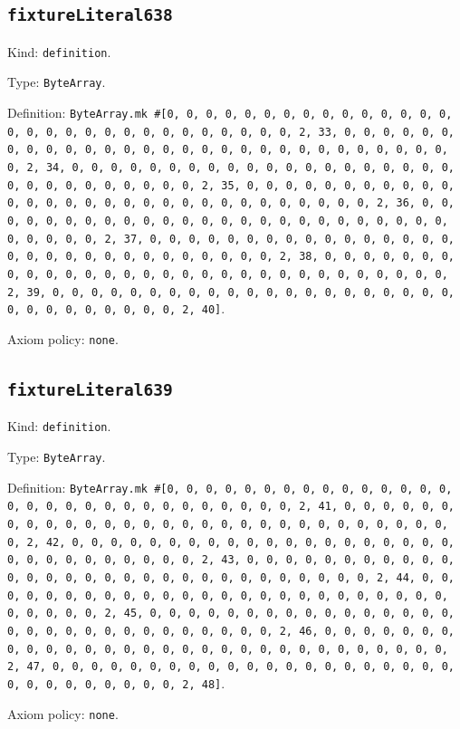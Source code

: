 \documentclass[11pt]{article}
\begin{document}
\subsection*{\texttt{fixtureLiteral638}}
\noindent Kind: \texttt{definition}.\par
\noindent Type: \texttt{ByteArray}.\par
\noindent Definition: \texttt{ByteArray.mk \#[0, 0, 0, 0, 0, 0, 0, 0, 0, 0, 0, 0, 0, 0, 0, 0, 0, 0, 0, 0, 0, 0, 0, 0, 0, 0, 0, 0, 0, 0, 2, 33, 0, 0, 0, 0, 0, 0, 0, 0, 0, 0, 0, 0, 0, 0, 0, 0, 0, 0, 0, 0, 0, 0, 0, 0, 0, 0, 0, 0, 0, 0, 2, 34, 0, 0, 0, 0, 0, 0, 0, 0, 0, 0, 0, 0, 0, 0, 0, 0, 0, 0, 0, 0, 0, 0, 0, 0, 0, 0, 0, 0, 0, 0, 2, 35, 0, 0, 0, 0, 0, 0, 0, 0, 0, 0, 0, 0, 0, 0, 0, 0, 0, 0, 0, 0, 0, 0, 0, 0, 0, 0, 0, 0, 0, 0, 2, 36, 0, 0, 0, 0, 0, 0, 0, 0, 0, 0, 0, 0, 0, 0, 0, 0, 0, 0, 0, 0, 0, 0, 0, 0, 0, 0, 0, 0, 0, 0, 2, 37, 0, 0, 0, 0, 0, 0, 0, 0, 0, 0, 0, 0, 0, 0, 0, 0, 0, 0, 0, 0, 0, 0, 0, 0, 0, 0, 0, 0, 0, 0, 2, 38, 0, 0, 0, 0, 0, 0, 0, 0, 0, 0, 0, 0, 0, 0, 0, 0, 0, 0, 0, 0, 0, 0, 0, 0, 0, 0, 0, 0, 0, 0, 2, 39, 0, 0, 0, 0, 0, 0, 0, 0, 0, 0, 0, 0, 0, 0, 0, 0, 0, 0, 0, 0, 0, 0, 0, 0, 0, 0, 0, 0, 0, 0, 2, 40]}.\par
\noindent Axiom policy: \texttt{none}.\par
\subsection*{\texttt{fixtureLiteral639}}
\noindent Kind: \texttt{definition}.\par
\noindent Type: \texttt{ByteArray}.\par
\noindent Definition: \texttt{ByteArray.mk \#[0, 0, 0, 0, 0, 0, 0, 0, 0, 0, 0, 0, 0, 0, 0, 0, 0, 0, 0, 0, 0, 0, 0, 0, 0, 0, 0, 0, 0, 0, 2, 41, 0, 0, 0, 0, 0, 0, 0, 0, 0, 0, 0, 0, 0, 0, 0, 0, 0, 0, 0, 0, 0, 0, 0, 0, 0, 0, 0, 0, 0, 0, 2, 42, 0, 0, 0, 0, 0, 0, 0, 0, 0, 0, 0, 0, 0, 0, 0, 0, 0, 0, 0, 0, 0, 0, 0, 0, 0, 0, 0, 0, 0, 0, 2, 43, 0, 0, 0, 0, 0, 0, 0, 0, 0, 0, 0, 0, 0, 0, 0, 0, 0, 0, 0, 0, 0, 0, 0, 0, 0, 0, 0, 0, 0, 0, 2, 44, 0, 0, 0, 0, 0, 0, 0, 0, 0, 0, 0, 0, 0, 0, 0, 0, 0, 0, 0, 0, 0, 0, 0, 0, 0, 0, 0, 0, 0, 0, 2, 45, 0, 0, 0, 0, 0, 0, 0, 0, 0, 0, 0, 0, 0, 0, 0, 0, 0, 0, 0, 0, 0, 0, 0, 0, 0, 0, 0, 0, 0, 0, 2, 46, 0, 0, 0, 0, 0, 0, 0, 0, 0, 0, 0, 0, 0, 0, 0, 0, 0, 0, 0, 0, 0, 0, 0, 0, 0, 0, 0, 0, 0, 0, 2, 47, 0, 0, 0, 0, 0, 0, 0, 0, 0, 0, 0, 0, 0, 0, 0, 0, 0, 0, 0, 0, 0, 0, 0, 0, 0, 0, 0, 0, 0, 0, 2, 48]}.\par
\noindent Axiom policy: \texttt{none}.\par
\end{document}
